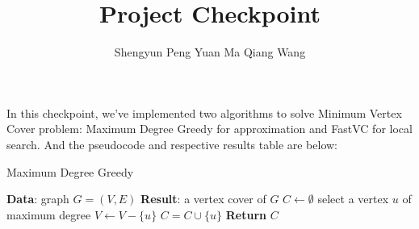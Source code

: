 \documentclass[12pt]{article}
\begin{document}
 
 
 
\title{Project Checkpoint}%
\author{Shengyun Peng \hspace{0.5 cm} 
Yuan Ma \hspace{0.5 cm}
Qiang Wang} %
\date{\vspace{-6ex}} 
\maketitle
In this checkpoint, we've implemented two algorithms to solve Minimum Vertex Cover problem: Maximum Degree Greedy\cite{delbot2010analytical} for approximation and FastVC\cite{cai2015balance} for local search. And the pseudocode and respective results table are below:




%  
\vspace{-2ex}
\begin{algorithm}
  \caption{Maximum Degree Greedy}
  \begin{algorithmic}[1] 
  \State \textbf{Data}: graph $G = (V,E)$
  \State \textbf{Result}: a vertex cover of $G$
  \State $C \leftarrow \emptyset$
        \State select a vertex $u$ of maximum degree
        \State $V \leftarrow V - \{u\} $
        \State $C = C \cup \{u\}$
      \EndWhile
      \State \textbf{Return} $C$
  \end{algorithmic}
\end{algorithm}
\end{document}
